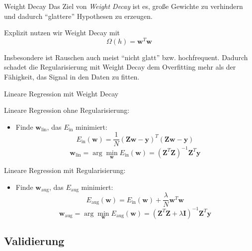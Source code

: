 \begin{defi}{Weight Decay}
    Das Ziel von \emph{Weight Decay} ist es, große Gewichte zu verhindern und dadurch \enquote{glattere} Hypothesen zu erzeugen.

    Explizit nutzen wir Weight Decay mit
    \[
        \Omega(h) = \mathbf{w}^T \mathbf{w}
    \]

    Insbesondere ist Rauschen auch meist \enquote{nicht glatt} bzw. hochfrequent.
    Dadurch schadet die Regularisierung mit Weight Decay dem Overfitting mehr als der Fähigkeit, das Signal in den Daten zu fitten.
\end{defi}

\begin{defi}{Lineare Regression mit Weight Decay}

    Lineare Regression ohne Regularisierung:
    \begin{itemize}
        \item Finde $\mathbf{w}_\text{lin}$, das $E_\text{in}$ minimiert:
              \[
                  E_\text{in}(\mathbf{w}) = \frac{1}{N} (\mathbf{Z}\mathbf{w} - \mathbf{y})^T (\mathbf{Z}\mathbf{w} - \mathbf{y})
              \]
              \[
                  \mathbf{w}_\text{lin} = \arg\min_\mathbf{w} E_\text{in}(\mathbf{w}) = (\mathbf{Z}^T \mathbf{Z})^{-1} \mathbf{Z}^T \mathbf{y}
              \]
    \end{itemize}

    Lineare Regression mit Regularisierung:
    \begin{itemize}
        \item Finde $\mathbf{w}_\text{aug}$, das $E_\text{aug}$ minimiert:
              \[
                  E_\text{aug}(\mathbf{w}) = E_\text{in}(\mathbf{w}) + \frac{\lambda}{N} \mathbf{w}^T \mathbf{w}
              \]
              \[
                  \mathbf{w}_\text{aug} = \arg\min_\mathbf{w} E_\text{aug}(\mathbf{w}) = (\mathbf{Z}^T \mathbf{Z} + \lambda \mathbf{I})^{-1} \mathbf{Z}^T \mathbf{y}
              \]
    \end{itemize}
\end{defi}

\subsection{Validierung}

